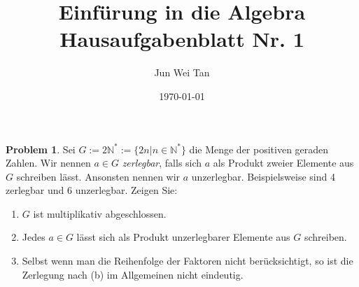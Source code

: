\documentclass[prb,12pt]{revtex4-2}
\theoremstyle{definition}
\newtheorem{Problem}{Problem}
\theoremstyle{definition}
\newenvironment{parts}{\begin{enumerate}[label=(\alph*)]}{\end{enumerate}}
\newcommand{\N}{\mathbb{N}}
\begin{document}
\title{Einf\"{u}rung in die Algebra Hausaufgabenblatt Nr. 1}
	\author{Jun Wei Tan}
	\date{\today}
	\maketitle
\begin{Problem}
	Sei $G := 2\N^* := \{2n | n \in \N^* \}$ die Menge der positiven geraden Zahlen. Wir nennen $a \in G$ \emph{zerlegbar}, falls sich $a$ als Produkt zweier Elemente aus $G$ schreiben lässt. Ansonsten nennen wir $a$ unzerlegbar. Beispielsweise sind 4 zerlegbar und 6 unzerlegbar. Zeigen Sie:
	\begin{parts}
		\item $G$ ist multiplikativ abgeschlossen.
		\item Jedes $a\in G$ l\"{a}sst sich als Produkt unzerlegbarer Elemente aus $G$ schreiben.
		\item Selbst wenn man die Reihenfolge der Faktoren nicht berücksichtigt, so ist die Zerlegung nach (b) im Allgemeinen nicht eindeutig.
	\end{parts}
\end{Problem}
\end{document}
